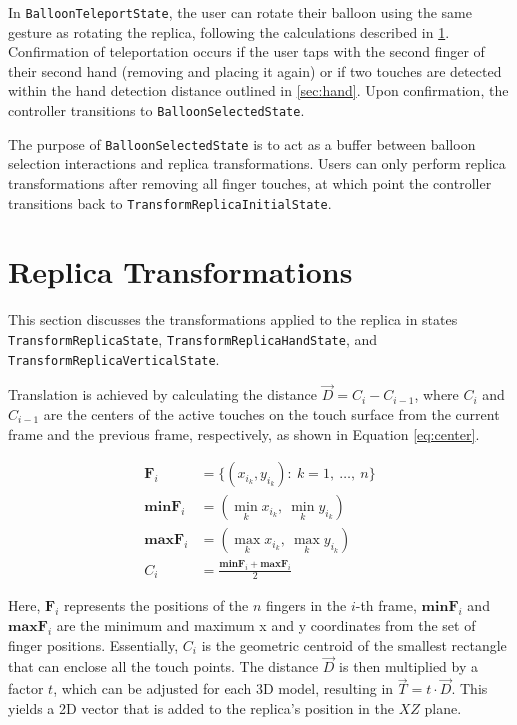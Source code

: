     In \lstinline{BalloonTeleportState}, the user can rotate their balloon using the same gesture as rotating the replica, following the calculations described in \ref{sec:transformation}. Confirmation of teleportation occurs if the user taps with the second finger of their second hand (removing and placing it again) or if two touches are detected within the hand detection distance outlined in \ref{sec:hand}. Upon confirmation, the controller transitions to \lstinline{BalloonSelectedState}.
    
    The purpose of \lstinline{BalloonSelectedState} is to act as a buffer between balloon selection interactions and replica transformations. Users can only perform replica transformations after removing all finger touches, at which point the controller transitions back to \lstinline{TransformReplicaInitial}\lstinline{State}.


\section{Replica Transformations} \label{sec:transformation}

    This section discusses the transformations applied to the replica in states \lstinline{TransformReplicaState}, \lstinline{TransformReplicaHandState}, and \lstinline{TransformReplicaVerticalState}.
    
    Translation is achieved by calculating the distance \(\vec{D} = C_{i} - C_{i-1}\), where \(C_{i}\) and \(C_{i-1}\) are the centers of the active touches on the touch surface from the current frame and the previous frame, respectively, as shown in Equation \ref{eq:center}.

    \begin{figure}[h]
    \begin{equation}
    \begin{split} \label{eq:center}
        \mathbf{F}_i &= \{(x_{i_k}, y_{i_k}) :\ k = 1,\ \dots,\ n\} \\
        \mathbf{minF}_i &= (\min_{k} x_{i_k},\ \min_{k} y_{i_k}) \\
        \mathbf{maxF}_i &= (\max_{k} x_{i_k},\ \max_{k} y_{i_k}) \\
        C_i &= \frac{\mathbf{minF}_i + \mathbf{maxF}_i}{2}
    \end{split}
    \end{equation}
    \end{figure}

    Here, \(\mathbf{F}_i\) represents the positions of the \(n\) fingers in the \(i\)-th frame, \(\mathbf{minF}_i\) and \(\mathbf{maxF}_i\) are the minimum and maximum x and y coordinates from the set of finger positions. Essentially, \(C_i\) is the geometric centroid of the smallest rectangle that can enclose all the touch points. The distance $\vec{D}$ is then multiplied by a factor \(t\), which can be adjusted for each 3D model, resulting in \(\vec{T} = t \cdot \vec{D}\). This yields a 2D vector that is added to the replica's position in the \(XZ\) plane.

